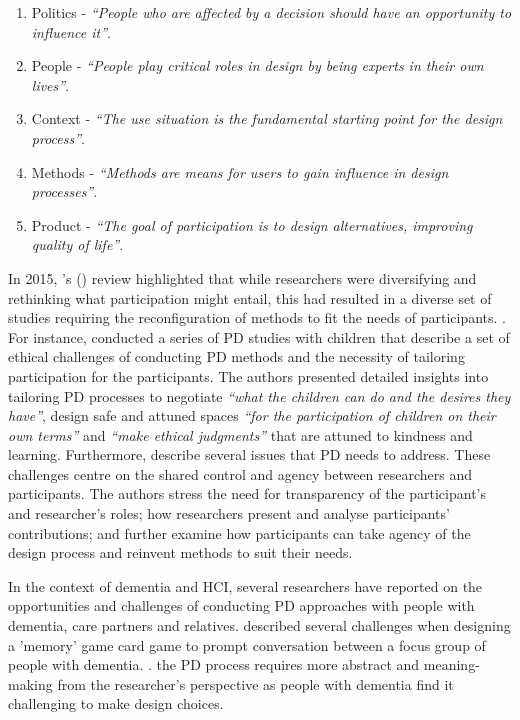 \begin{enumerate}
\item Politics - \textit{``People who are affected by a decision should have an opportunity to influence it''}.
\item People - \textit{``People play critical roles in design by being experts in their own lives''}.
\item Context - \textit{``The use situation is the fundamental starting point for the design process''}.
\item Methods - \textit{``Methods are means for users to gain influence in design processes''}.
\item Product - \textit{``The goal of participation is to design alternatives, improving quality of life''}.
\end{enumerate}

In 2015, \citeauthor{halskov2015diversity}'s (\citeyear{halskov2015diversity}) review  highlighted that while researchers were diversifying and rethinking what participation might entail, this had resulted in a diverse set of studies requiring the reconfiguration of methods to fit the needs of participants. . For instance, \cite{spiel2018micro} conducted a series of PD studies with children that describe a set of ethical challenges of conducting PD methods and the necessity of tailoring participation for the participants. The authors presented detailed insights into tailoring PD processes to negotiate \textit{``what the children can do and the desires they have''}, design safe and attuned spaces \textit{``for the participation of children on their own terms''} and \textit{``make ethical judgments''} that are attuned to kindness and learning. Furthermore, \cite{vines_configuring_2013} describe several issues that PD needs to address. These challenges centre on the shared control and agency between researchers and participants. The authors stress the need for transparency of the participant's and researcher's roles; how researchers present and analyse participants' contributions; and further examine how participants can take agency of the design process and reinvent methods to suit their needs.

In the context of dementia and HCI, several researchers have reported on the opportunities and challenges of conducting PD approaches with people with dementia, care partners and relatives. \cite{mayer2013lessons} described several challenges when designing a 'memory' game card game to prompt conversation between a focus group of people with dementia. .  the PD process requires more abstract and meaning-making from the researcher's perspective as people with dementia find it challenging to make design choices.

